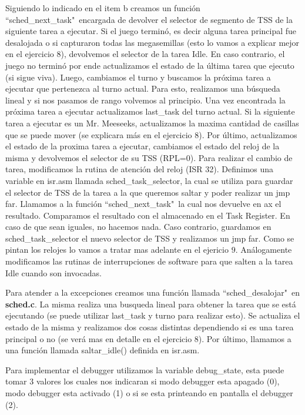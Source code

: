 \documentclass[a4paper]{article}
\begin{document}
\justify
Siguiendo lo indicado en el item b creamos un función ``sched_next_task"\ encargada de devolver el selector de segmento de TSS de la siguiente tarea a ejecutar. Si el juego terminó, es decir alguna tarea principal fue desalojada o si capturaron todas las megasemillas (esto lo vamos a explicar mejor en el ejercicio $8$), devolvemos el selector de la tarea Idle. En caso contrario, el juego no terminó por ende actualizamos el estado de la última tarea que ejecuto (si sigue viva). Luego, cambiamos el turno y buscamos la próxima tarea a ejecutar que pertenezca al turno actual. Para esto, realizamos una búsqueda lineal y si nos pasamos de rango volvemos al principio. Una vez encontrada la próxima tarea a ejecutar actualizamos last_task del turno actual. Si la siguiente tarea a ejecutar es un Mr. Meeseeks, actualizamos la maxima cantidad de casillas que se puede mover (se explicara más en el ejercicio $8$). Por último, actualizamos el estado de la proxima tarea a ejecutar, cambiamos el estado del reloj de la misma y devolvemos el selector de su TSS (RPL=0).
\justify
Para realizar el cambio de tarea, modificamos la rutina de atención del reloj (ISR 32). Definimos una variable en isr.asm llamada sched_task_selector, la cual se utiliza para guardar el selector de TSS de la tarea a la que queremos saltar y poder realizar un jmp far. Llamamos a la función ``sched_next_task"\ la cual nos devuelve en ax el resultado. Comparamos el resultado con el almacenado en el Task Register. En caso de que sean iguales, no hacemos nada. Caso contrario, guardamos en sched_task_selector el nuevo selector de TSS y realizamos un jmp far. Como se pintan los relojes lo vamos a tratar mas adelante en el ejericio $9$.
\justify
Análogamente modificamos las rutinas de interrupciones de software para que salten a la tarea Idle cuando son invocadas.

\justify
Para atender a la excepciones creamos una función llamada ``sched_desalojar"\ en \textbf{sched.c}. La misma realiza una busqueda lineal para obtener la tarea que se está ejecutando (se puede utilizar last_task y turno para realizar esto). Se actualiza el estado de la misma y realizamos dos cosas distintas dependiendo si es una tarea principal o no (se verá mas en detalle en el ejercicio $8$). Por último, llamamos a una función llamada saltar_idle() definida en isr.asm.


\justify
Para implementar el debugger utilizamos la variable debug_state, esta puede tomar $3$ valores los cuales nos indicaran si modo debugger esta apagado (0), modo debugger esta activado (1) o si se esta printeando en pantalla el debugger (2).
\end{document}
